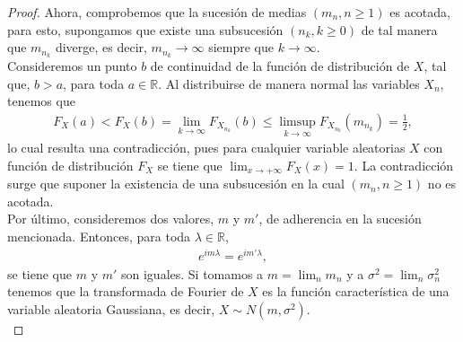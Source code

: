 \begin{proof}
Ahora, comprobemos que la sucesión de medias $(m_n, n \geq 1)$ es acotada, para esto, supongamos que existe una subsucesión $(n_k, k \geq 0)$ de tal manera que $m_{n_k}$ diverge, es decir, $m_{n_k} \rightarrow \infty$ siempre que $k \rightarrow \infty$. \\ 

Consideremos un punto $b$ de continuidad de la función de distribución de $X$, tal que, $b > a$, para toda $a \in \mathbb{R}$. Al distribuirse de manera normal las variables $X_n$, tenemos que
	\begin{align*}
	F_X (a) < F_X (b) = \lim_{k \rightarrow \infty} F_{X_{n_k}} (b) \leq \limsup_{k \rightarrow \infty} F_{X_{n_k}} (m_{n_k}) = \frac{1}{2}, 
	\end{align*}
lo cual resulta una contradicción, pues para cualquier variable aleatorias $X$ con función de distribución $F_X$ se tiene que $\lim_{x \rightarrow + \infty} F_X (x) = 1$. La contradicción surge que suponer la existencia de una subsucesión en la cual $(m_n, n \geq 1)$ no es acotada. \\

Por último, consideremos dos valores, $m$ y $m'$, de adherencia en la sucesión mencionada. Entonces, para toda $\lambda \in \mathbb{R}$, 
	\begin{align*}
	e^{i m \lambda} = e^{i m' \lambda},
	\end{align*}
se tiene que $m$ y $m'$ son iguales. Si tomamos a $m = \lim_n m_n$ y a $\sigma^2 = \lim_n \sigma_n^2$ tenemos que la transformada de Fourier de $X$ es la función característica de una variable aleatoria Gaussiana, es decir, $X \sim N(m, \sigma^2)$. \\


\end{proof}
